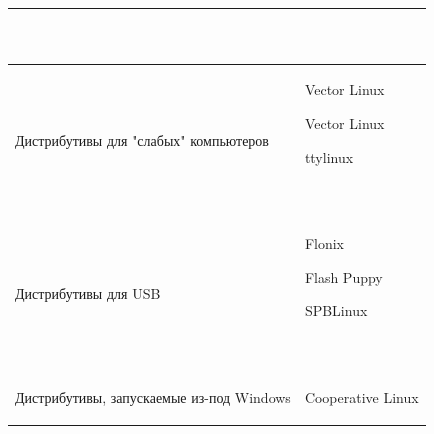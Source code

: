 \documentclass[bachelor, och, referat, times]{SCWorks}
\begin{document}
\begin{longtable}{|p{}|
p{}|}
\begin{minipage}{\textwidth}
\begin{list}{•}{~}
        \end{list}
        ~
    \end{minipage}
    \\\hline
    Дистрибутивы для "слабых" компьютеров &
    \begin{minipage}{\textwidth}
        \begin{list}{•}{~}
            \item Vector Linux
            \item Vector Linux
            \item ttylinux
        \end{list}
        ~
    \end{minipage}
    \\\hline
    Дистрибутивы для USB &
    \begin{minipage}{\textwidth}
        \begin{list}{•}{~}
            \item Flonix
            \item Flash Puppy
            \item SPBLinux
        \end{list}
        ~
    \end{minipage}
    \\\hline
    Дистрибутивы, запускаемые из-под Windows &
    \begin{minipage}{\textwidth}
        \begin{list}{•}{~}
            \item Cooperative Linux
        \end{list}
        
    \end{minipage}
    \\
    \hline
\end{longtable}
\end{document}

